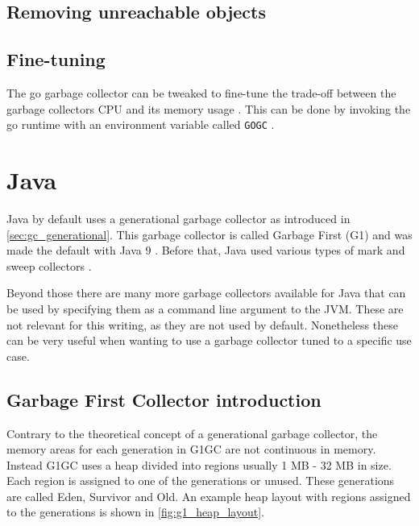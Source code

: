 \subsection{Removing unreachable objects}

\subsection{Fine-tuning}

The go garbage collector can be tweaked to fine-tune the trade-off between the
garbage collectors CPU and its memory usage \cite[The GC
cycle]{go_gcguide_2022}. This can be done by invoking the go runtime with an
environment variable called \texttt{GOGC} \cite[GOGC]{go_gcguide_2022}.

\section{Java}

Java by default uses a generational garbage collector as introduced in
\autoref{sec:gc_generational}. This garbage collector is called Garbage First
(G1) and was made the default with Java 9 \cite{java_gc_comparison_2018}.
Before that, Java used various types of mark and sweep collectors
\cite{java_available_gcs}.

Beyond those there are many more garbage collectors available for Java that can
be used by specifying them as a command line argument to the JVM. These are not
relevant for this writing, as they are not used by default. Nonetheless these
can be very useful when wanting to use a garbage collector tuned to a specific
use case.

\subsection{Garbage First Collector introduction}

Contrary to the theoretical concept of a generational garbage collector,
the memory areas for each generation in G1GC are not continuous in memory.
Instead G1GC uses a heap divided into regions usually 1 MB - 32 MB in size.
Each region is assigned to one of the generations or unused.
These generations are called Eden, Survivor and Old. \cite{java_g1_getting_started}
An example heap layout with regions assigned to the generations is shown in \autoref{fig:g1_heap_layout}.

